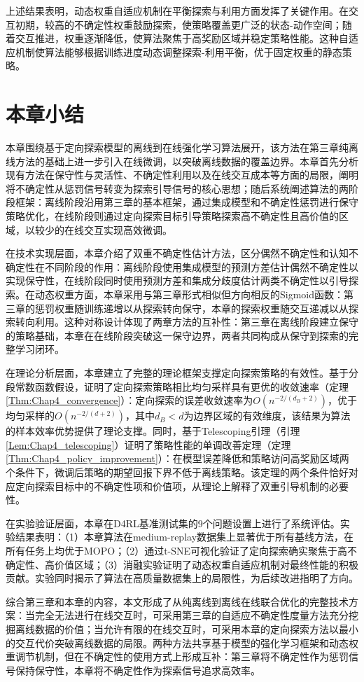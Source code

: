 上述结果表明，动态权重自适应机制在平衡探索与利用方面发挥了关键作用。在交互初期，较高的不确定性权重鼓励探索，使策略覆盖更广泛的状态-动作空间；随着交互推进，权重逐渐降低，使算法聚焦于高奖励区域并稳定策略性能。这种自适应机制使算法能够根据训练进度动态调整探索-利用平衡，优于固定权重的静态策略。


\section{本章小结}\label{Sec4.5}

本章围绕基于定向探索模型的离线到在线强化学习算法展开，该方法在第三章纯离线方法的基础上进一步引入在线微调，以突破离线数据的覆盖边界。本章首先分析现有方法在保守性与灵活性、不确定性利用以及在线交互成本等方面的局限，阐明将不确定性从惩罚信号转变为探索引导信号的核心思想；随后系统阐述算法的两阶段框架：离线阶段沿用第三章的基本框架，通过集成模型和不确定性惩罚进行保守策略优化，在线阶段则通过定向探索目标引导策略探索高不确定性且高价值的区域，以较少的在线交互实现高效微调。

在技术实现层面，本章介绍了双重不确定性估计方法，区分偶然不确定性和认知不确定性在不同阶段的作用：离线阶段使用集成模型的预测方差估计偶然不确定性以实现保守性，在线阶段同时使用预测方差和集成分歧度估计两类不确定性以引导探索。在动态权重方面，本章采用与第三章形式相似但方向相反的Sigmoid函数：第三章的惩罚权重随训练递增以从探索转向保守，本章的探索权重随交互递减以从探索转向利用。这种对称设计体现了两章方法的互补性：第三章在离线阶段建立保守的策略基础，本章在在线阶段突破这一保守边界，两者共同构成从保守到探索的完整学习闭环。

在理论分析层面，本章建立了完整的理论框架支撑定向探索策略的有效性。基于分段常数函数假设，证明了定向探索策略相比均匀采样具有更优的收敛速率（定理\ref{Thm:Chap4_convergence}）：定向探索的误差收敛速率为$O(n^{-2/(d_B+2)})$，优于均匀采样的$O(n^{-2/(d+2)})$，其中$d_B < d$为边界区域的有效维度，该结果为算法的样本效率优势提供了理论支撑。同时，基于Telescoping引理（引理\ref{Lem:Chap4_telescoping}）证明了策略性能的单调改善定理（定理\ref{Thm:Chap4_policy_improvement}）：在模型误差降低和策略访问高奖励区域两个条件下，微调后策略的期望回报下界不低于离线策略。该定理的两个条件恰好对应定向探索目标中的不确定性项和价值项，从理论上解释了双重引导机制的必要性。

在实验验证层面，本章在D4RL基准测试集的9个问题设置上进行了系统评估。实验结果表明：（1）本章算法在medium-replay数据集上显著优于所有基线方法，在所有任务上均优于MOPO；（2）通过t-SNE可视化验证了定向探索确实聚焦于高不确定性、高价值区域；（3）消融实验证明了动态权重自适应机制对最终性能的积极贡献。实验同时揭示了算法在高质量数据集上的局限性，为后续改进指明了方向。

综合第三章和本章的内容，本文形成了从纯离线到离线在线联合优化的完整技术方案：当完全无法进行在线交互时，可采用第三章的自适应不确定性度量方法充分挖掘离线数据的价值；当允许有限的在线交互时，可采用本章的定向探索方法以最小的交互代价突破离线数据的局限。两种方法共享基于模型的强化学习框架和动态权重调节机制，但在不确定性的使用方式上形成互补：第三章将不确定性作为惩罚信号保持保守性，本章将不确定性作为探索信号追求高效率。
